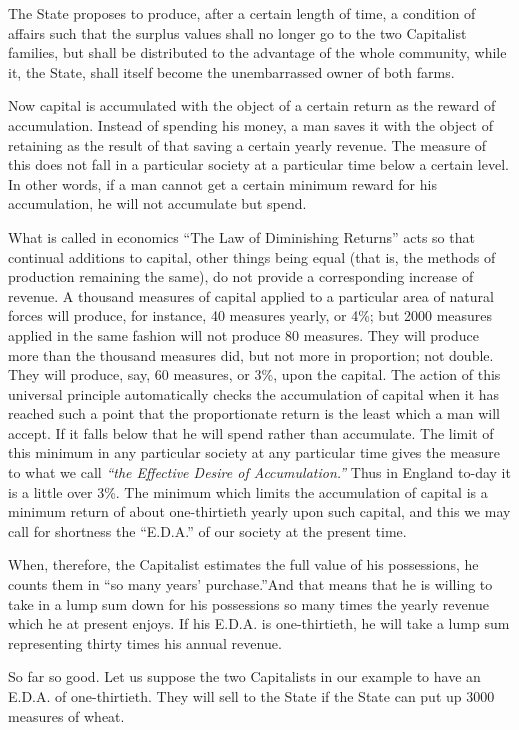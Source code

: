 \documentclass{book}
\begin{document}
The State proposes to produce, after a certain length of time, a condition of affairs such that the surplus values shall no longer go to the two Capitalist families, but shall be distributed to the advantage of the whole community, while it, the State, shall itself become the unembarrassed owner of both farms.

Now capital is accumulated with the object of a certain return as the reward of accumulation. Instead of spending his money, a man saves it with the object of retaining as the result of that saving a certain yearly revenue. The measure of this does not fall in a particular society at a particular time below a certain level. In other words, if a man cannot get a certain minimum reward for his accumulation, he will not accumulate but spend.

What is called in economics “The Law of Diminishing Returns” acts so that continual additions to capital, other things being equal (that is, the methods of production remaining the same), do not provide a corresponding increase of revenue. A thousand measures of capital applied to a particular area of natural forces will produce, for instance, 40 measures yearly, or 4\%; but 2000 measures applied in the same fashion will not produce 80 measures. They will produce more than the thousand measures did, but not more in proportion; not double. They will produce, say, 60 measures, or 3\%, upon the capital. The action of this universal principle automatically checks the accumulation of capital when it has reached such a point that the proportionate return is the least which a man will accept. If it falls below that he will spend rather than accumulate. The limit of this minimum in any particular society at any particular time gives the measure to what we call \emph{“the Effective Desire of Accumulation.”} Thus in England to-day it is a little over 3\%. The minimum which limits the accumulation of capital is a minimum return of about one-thirtieth yearly upon such capital, and this we may call for shortness the “E.D.A.” of our society at the present time.

When, therefore, the Capitalist estimates the full value of his possessions, he counts them in “so many years’ purchase.”\footnotemark[1] And that means that he is willing to take in a lump sum down for his possessions so many times the yearly revenue which he at present enjoys. If his E.D.A. is one-thirtieth, he will take a lump sum representing thirty times his annual revenue.

So far so good. Let us suppose the two Capitalists in our example to have an E.D.A. of one-thirtieth. They will sell to the State if the State can put up 3000 measures of wheat.
\end{document}
